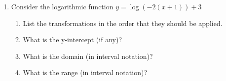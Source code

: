 \documentclass[letterpaper,12pt,fleqn]{article}
\begin{document}
\begin{enumerate}
\item Consider the logarithmic function $y=\log(-2(x+1))+3$
  \begin{enumerate}
  \item List the transformations in the order that they should be applied.
  \item What is the y-intercept (if any)?
  \item What is the domain (in interval notation)?
  \item What is the range (in interval notation)?
  \end{enumerate}
\end{enumerate}
 
\end{document}
